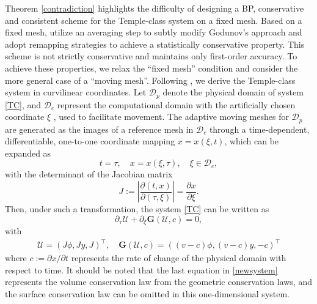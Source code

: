 \documentclass[times,final,11pt]{elsarticle}
\numberwithin{equation}{section}
\theoremstyle{definition}
\theoremstyle{remark}
\begin{document}
Theorem \ref{contradiction} highlights the difficulty of designing a BP, conservative and consistent scheme for the Temple-class system on a fixed mesh.  Based on a fixed mesh, \cite{chalons2007transport,chalons2008godunov,betancourt2018random} utilize an averaging step to subtly modify Godunov’s approach and adopt remapping strategies to achieve a statistically conservative property. This scheme is not strictly conservative and maintains only first-order accuracy. To achieve these properties, we relax the ``fixed mesh'' condition and consider the more general case of a ``moving mesh''. Following \cite{duan2021entropy}, we derive the Temple-class system in curvilinear coordinates. Let $\mathcal{D}_{p}$ denote the physical domain of system \eqref{TC}, and $\mathcal{D}_c$ represent the computational domain with the artificially chosen coordinate $\xi$ , used to facilitate movement. The adaptive moving meshes for $\mathcal{D}_p$ are generated as the images of a reference mesh in $\mathcal{D}_c$ through a time-dependent, differentiable, one-to-one coordinate mapping $x = x (\xi, t)$, which can be expanded as
\begin{equation*}
	t = \tau, \quad x = x(\xi, \tau), \quad \xi \in \mathcal{D}_c,
\end{equation*}
with the determinant of the Jacobian matrix
\begin{equation*}
	J := \left\vert \frac{\partial (t, x)}{\partial (\tau, \xi)} \right\vert = \frac{\partial x}{\partial \xi}.
\end{equation*}
Then, under such a  transformation, the system \eqref{TC} can be written as
\begin{equation}\label{newsystem}
    \partial_\tau \boldsymbol{\mathcal{U}} + \partial_\xi \mathbf{G}(\boldsymbol{\mathcal{U}}, c) = 0,
\end{equation}
with
\begin{equation*}
    \begin{aligned}
        \boldsymbol{\mathcal{U}} = (J\phi, Jy, J)^\top, \quad \mathbf{G}(\boldsymbol{\mathcal{U}},c) = \left((v - c)\phi, (v - c)y, - c\right)^\top
    \end{aligned}
\end{equation*}
where $c := \partial x / \partial t$ represents the rate of change of the physical domain with respect to time. It should be noted that the last equation in \eqref{newsystem} represents the volume conservation law from the geometric conservation laws, and the surface conservation law can be omitted in this one-dimensional system.
\end{document}
